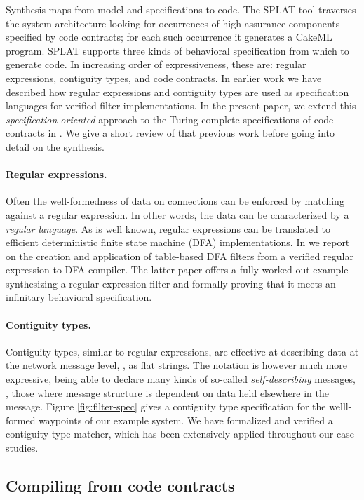 Synthesis maps from model and specifications to code. The SPLAT tool
traverses the system architecture looking for occurrences of high
assurance components specified by code contracts; for each such
occurrence it generates a CakeML program. SPLAT supports three kinds
of behavioral specification from which to generate code. In increasing
order of expressiveness, these are: regular expressions, contiguity
types, and code contracts. In earlier work we have described how
regular expressions and contiguity types are used as specification
languages for verified filter implementations. In the present paper,
we extend this \emph{specification oriented} approach to the
Turing-complete specifications of code contracts in \agr.  We give a short review of
that previous work before going into detail on the synthesis.

\paragraph{Regular expressions.} Often the well-formedness of data on connections
can be enforced by matching against a regular expression. In other
words, the data can be characterized by a \emph{regular language}. As
is well known, regular expressions can be translated to efficient
deterministic finite state machine (DFA)
implementations. In \cite{formal-filter-synth-langsec,case-verified-filter}
we report on the creation and application of table-based DFA filters
from a verified regular expression-to-DFA compiler. The latter paper
offers a fully-worked out example synthesizing a regular expression
filter and formally proving that it meets an infinitary behavioral
specification.

\paragraph{Contiguity types\cite{contiguity-types}.}
Contiguity types, similar to regular expressions, are effective at
describing data at the network message level, \eg, as flat
strings. The notation is however much more expressive, being able to
declare many kinds of so-called \emph{self-describing} messages, \ie,
those where message structure is dependent on data held elsewhere in
the message. Figure \ref{fig:filter-spec} gives a contiguity type
specification for the welll-formed waypoints of our example system. We
have formalized and verified a contiguity type matcher, which has been
extensively applied throughout our case studies.

\subsection{Compiling from code contracts}


